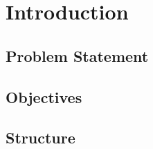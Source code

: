\section{Introduction}

\subsection{Problem Statement}

\subsection{Objectives}

\subsection{Structure}